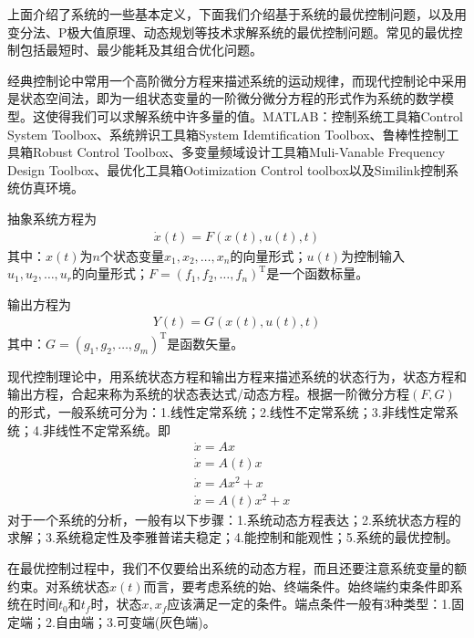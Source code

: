             \par
            上面介绍了系统的一些基本定义，下面我们介绍基于系统的最优控制问题，以及用变分法、P极大值原理、动态规划等技术求解系统的最优控制问题。常见的最优控制包括最短时、最少能耗及其组合优化问题。
            \par
            经典控制论中常用一个高阶微分方程来描述系统的运动规律，而现代控制论中采用是状态空间法，即为一组状态变量的一阶微分微分方程的形式作为系统的数学模型。这使得我们可以求解系统中许多量的值。MATLAB：控制系统工具箱Control System Toolbox、系统辨识工具箱System Idemtification Toolbox、鲁棒性控制工具箱Robust Control Toolbox、多变量频域设计工具箱Muli-Vanable Frequency Design Toolbox、最优化工具箱Ootimization Control toolbox以及Similink控制系统仿真环境。
            \par
            抽象系统方程为
            \begin{align*}
            \dot{x}(t) = F(x(t),u(t),t)
            \end{align*}
            其中：$x(t)$为$n$个状态变量$x_1,x_2,\dots,x_n$的向量形式；$u(t)$为控制输入$u_1,u_2,\dots,u_r$的向量形式；$F=(f_1,f_2,\dots,f_n)^\mathrm{T}$是一个函数标量。
            \par
            输出方程为
            \begin{align*}
            Y(t) = G(x(t),u(t),t)
            \end{align*}
            其中：$G=(g_1,g_2,\dots,g_m)^\mathrm{T}$是函数矢量。
            \par
            现代控制理论中，用系统状态方程和输出方程来描述系统的状态行为，状态方程和输出方程，合起来称为系统的状态表达式/动态方程。根据一阶微分方程$(F,G)$的形式，一般系统可分为：1.线性定常系统；2.线性不定常系统；3.非线性定常系统；4.非线性不定常系统。即
            \begin{align*}
            & \dot{x} = A x\\
            & \dot{x} = A(t)x\\
            & \dot{x} = Ax^2+x\\
            & \dot{x} = A(t)x^2+x
            \end{align*}
            对于一个系统的分析，一般有以下步骤：1.系统动态方程表达；2.系统状态方程的求解；3.系统稳定性及李雅普诺夫稳定；4.能控制和能观性；5.系统的最优控制。
            \par
            在最优控制过程中，我们不仅要给出系统的动态方程，而且还要注意系统变量的额约束。对系统状态$x(t)$而言，要考虑系统的始、终端条件。始终端约束条件即系统在时间$t_0$和$t_f$时，状态$x,x_f$应该满足一定的条件。端点条件一般有3种类型：1.固定端；2.自由端；3.可变端(灰色端)。
